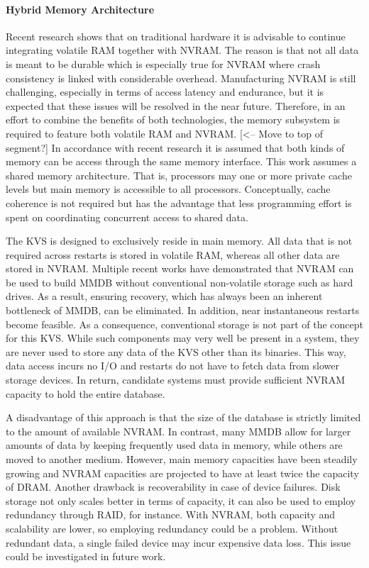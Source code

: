\paragraph{Hybrid Memory Architecture}

Recent research shows that on traditional hardware it is advisable to continue
integrating volatile RAM together with NVRAM. The reason is that not all data is
meant to be durable which is especially true for NVRAM where crash consistency
is linked with considerable overhead. Manufacturing NVRAM is still challenging,
especially in terms of access latency and endurance, but it is expected that
these issues will be resolved in the near future. Therefore, in an effort to
combine the benefits of both technologies, the memory subsystem is required to
feature both volatile RAM and NVRAM. [<-- Move to top of segment?] In accordance
with recent research it is assumed that both kinds of memory can be access
through the same memory interface. This work assumes a shared memory
architecture. That is, processors may one or more private cache levels but main
memory is accessible to all processors. Conceptually, cache coherence is not
required but has the advantage that less programming effort is spent on
coordinating concurrent access to shared data.

The KVS is designed to exclusively reside in main memory. All data that is not
required across restarts is stored in volatile RAM, whereas all other data are
stored in NVRAM. Multiple recent works have demonstrated that NVRAM can be used
to build MMDB without conventional non-volatile storage such as hard drives. As
a result, ensuring recovery, which has always been an inherent bottleneck of
MMDB, can be eliminated. In addition, near instantaneous restarts become
feasible. As a consequence, conventional storage is not part of the concept for
this KVS. While such components may very well be present in a system, they are
never used to store any data of the KVS other than its binaries. This way, data
access incurs no I/O and restarts do not have to fetch data from slower storage
devices. In return, candidate systems must provide sufficient NVRAM capacity to
hold the entire database.

A disadvantage of this approach is that the size of the database is strictly
limited to the amount of available NVRAM. In contrast, many MMDB allow for
larger amounts of data by keeping frequently used data in memory, while others
are moved to another medium. However, main memory capacities have been steadily
growing and NVRAM capacities are projected to have at least twice the capacity
of DRAM. Another drawback is recoverability in case of device failures. Disk
storage not only scales better in terms of capacity, it can also be used to
employ redundancy through RAID, for instance. With NVRAM, both capacity and
scalability are lower, so employing redundancy could be a problem. Without
redundant data, a single failed device may incur expensive data loss. This issue
could be investigated in future work.

